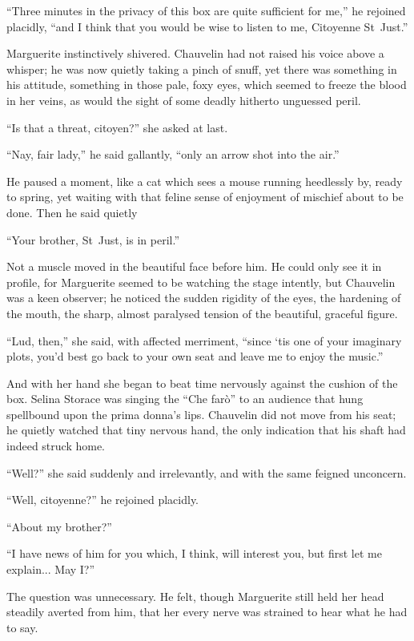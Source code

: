 \enquote{Three minutes in the privacy of this box are quite sufficient for me,} he rejoined placidly, \enquote{and I think that you would be wise to listen to me, Citoyenne St~Just.}

Marguerite instinctively shivered. Chauvelin had not raised his voice above a whisper; he was now quietly taking a pinch of snuff, yet there was something in his attitude, something in those pale, foxy eyes, which seemed to freeze the blood in her veins, as would the sight of some deadly hitherto unguessed peril.

\enquote{Is that a threat, citoyen?} she asked at last.

\enquote{Nay, fair lady,} he said gallantly, \enquote{only an arrow shot into the air.}

He paused a moment, like a cat which sees a mouse running heedlessly by, ready to spring, yet waiting with that feline sense of enjoyment of mischief about to be done. Then he said quietly\longdash


\enquote{Your brother, St~Just, is in peril.}

Not a muscle moved in the beautiful face before him. He could only see it in profile, for Marguerite seemed to be watching the stage intently, but Chauvelin was a keen observer; he noticed the sudden rigidity of the eyes, the hardening of the mouth, the sharp, almost paralysed tension of the beautiful, graceful figure.

\enquote{Lud, then,} she said, with affected merriment, \enquote{since `tis one of your imaginary plots, you'd best go back to your own seat and leave me to enjoy the music.}

And with her hand she began to beat time nervously against the cushion of the box. Selina Storace was singing the \enquote{Che farò} to an audience that hung spellbound upon the prima donna's lips. Chauvelin did not move from his seat; he quietly watched that tiny nervous hand, the only indication that his shaft had indeed struck home.

\enquote{Well?} she said suddenly and irrelevantly, and with the same feigned unconcern.

\enquote{Well, citoyenne?} he rejoined placidly.

\enquote{About my brother?}

\enquote{I have news of him for you which, I think, will interest you, but first let me explain... May I?}

The question was unnecessary. He felt, though Marguerite still held her head steadily averted from him, that her every nerve was strained to hear what he had to say.

